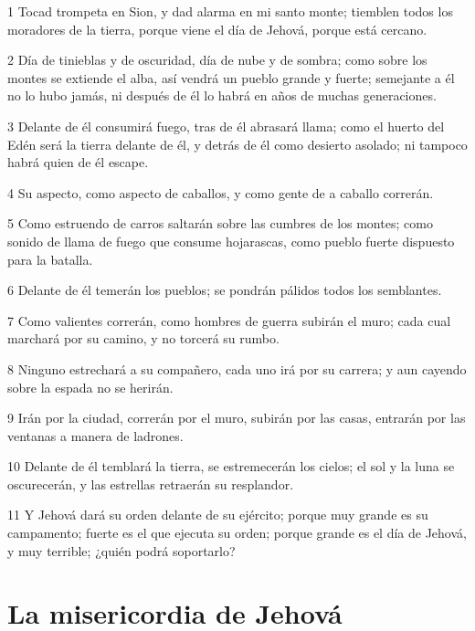 \par 1 Tocad trompeta en Sion, y dad alarma en mi santo monte; tiemblen todos los moradores de la tierra, porque viene el día de Jehová, porque está cercano.
\par 2 Día de tinieblas y de oscuridad, día de nube y de sombra; como sobre los montes se extiende el alba, así vendrá un pueblo grande y fuerte; semejante a él no lo hubo jamás, ni después de él lo habrá en años de muchas generaciones.
\par 3 Delante de él consumirá fuego, tras de él abrasará llama; como el huerto del Edén será la tierra delante de él, y detrás de él como desierto asolado; ni tampoco habrá quien de él escape.
\par 4 Su aspecto, como aspecto de caballos, y como gente de a caballo correrán.
\par 5 Como estruendo de carros saltarán sobre las cumbres de los montes; como sonido de llama de fuego que consume hojarascas, como pueblo fuerte dispuesto para la batalla. 
\par 6 Delante de él temerán los pueblos; se pondrán pálidos todos los semblantes.
\par 7 Como valientes correrán, como hombres de guerra subirán el muro; cada cual marchará por su camino, y no torcerá su rumbo.
\par 8 Ninguno estrechará a su compañero, cada uno irá por su carrera; y aun cayendo sobre la espada no se herirán.
\par 9 Irán por la ciudad, correrán por el muro, subirán por las casas, entrarán por las ventanas a manera de ladrones.
\par 10 Delante de él temblará la tierra, se estremecerán los cielos; el sol y la luna se oscurecerán, y las estrellas retraerán su resplandor. 
\par 11 Y Jehová dará su orden delante de su ejército; porque muy grande es su campamento; fuerte es el que ejecuta su orden; porque grande es el día de Jehová, y muy terrible; ¿quién podrá soportarlo? 

\section*{La misericordia de Jehová}

